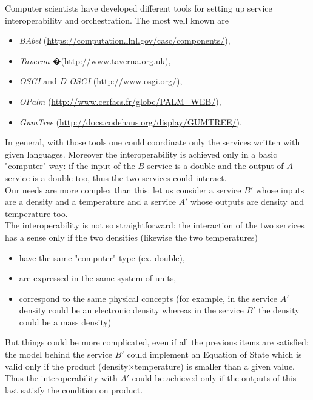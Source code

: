 \documentclass[a4paper,11pt] {ivoa}
\begin{document}
Computer scientists have developed different tools for setting up service interoperability and
orchestration. The most well known are
\begin{itemize}
\item {\it BAbel} (\href{https://computation.llnl.gov/casc/components/}{https://computation.llnl.gov/casc/components/}),
\item {\it Taverna }�(\href{http://www.taverna.org.uk}{http://www.taverna.org.uk}),
\item {\it OSGI} and {\it D-OSGI } (\href{http://www.osgi.org/}{http://www.osgi.org/}),
\item {\it OPalm} (\href{http://www.cerfacs.fr/globc/PALM_WEB/}{http://www.cerfacs.fr/globc/PALM\_WEB/}),
\item {\it GumTree} (\href{http://docs.codehaus.org/display/GUMTREE/}{http://docs.codehaus.org/display/GUMTREE/}).
\end{itemize}
In general, with those tools one could coordinate only the services written with given languages.
Moreover the interoperability is achieved only in a basic "computer" way: if the input of the $B$
service is a double and the output of $A$ service is a double too, thus the two services could
interact.\\

Our needs are more complex than this: let us consider a service $B'$ whose inputs are a density and
a temperature and a service $A'$ whose outputs are density and temperature too. \\
The interoperability is not so straightforward: the interaction of the two services has a sense only
if the two densities (likewise the two temperatures)
\begin{itemize}
\item have the same "computer" type (ex. double),
\item are expressed in the same system of units,
\item correspond to the same physical concepts (for example, in the service $A'$ density could be
an electronic density whereas in the service $B'$ the density could be a mass density)
\end{itemize}
But things could be more complicated, even if all the previous items are satisfied: the model behind
the service $B'$ could implement an Equation of State which is valid only if the product
(density$\times$temperature) is smaller than a given value.
Thus the interoperability with $A'$ could be achieved only if the outputs of this last satisfy the
condition on product.\\
\end{document}

